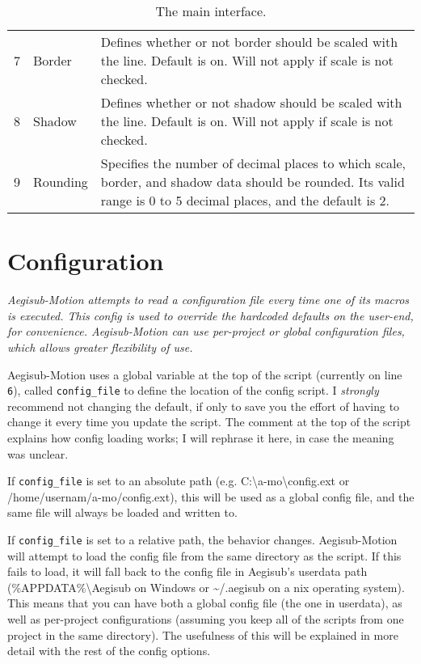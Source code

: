 ﻿\documentclass[a4paper,12pt]{article}
\begin{document}
\begin{table}[th]
\begin{tabular}{|rlp{12cm}|}
      7 & Border & Defines whether or not border should be scaled with the line. Default is on. Will not apply if scale is not checked. \\
      8 & Shadow & Defines whether or not shadow should be scaled with the line. Default is on. Will not apply if scale is not checked. \\
      9 & Rounding & Specifies the number of decimal places to which scale, border, and shadow data should be rounded. Its valid range is 0 to 5 decimal places, and the default is 2. \\
    \end{tabular}
    \caption{The main interface.}
    \label{tab:main}
  \end{table}

  \section{Configuration}
  \emph{Aegisub-Motion attempts to read a configuration file every time one of its macros is executed. This config is used to override the hardcoded defaults on the user-end, for convenience. Aegisub-Motion can use per-project or global configuration files, which allows greater flexibility of use.}

  \medskip

  Aegisub-Motion uses a global variable at the top of the script (currently on line {\tt6}), called {\tt config\_file} to define the location of the config script. I \emph{strongly} recommend not changing the default, if only to save you the effort of having to change it every time you update the script. The comment at the top of the script explains how config loading works; I will rephrase it here, in case the meaning was unclear.
  
  If {\tt{}config\_file} is set to an absolute path (e.g. C:\textbackslash{}a-mo\textbackslash{}config.ext or /home/usernam/a-mo/config.ext), this will be used as a global config file, and the same file will always be loaded and written to.
  
  If {\tt{}config\_file} is set to a relative path, the behavior changes. Aegisub-Motion will attempt to load the config file from the same directory as the script. If this fails to load, it will fall back to the config file in Aegisub's userdata path (\%APPDATA\%\textbackslash{}Aegisub on Windows or \textasciitilde/.aegisub on a \*nix operating system). This means that you can have both a global config file (the one in userdata), as well as per-project configurations (assuming you keep all of the scripts from one project in the same directory). The usefulness of this will be explained in more detail with the rest of the config options.
  
\end{document}
